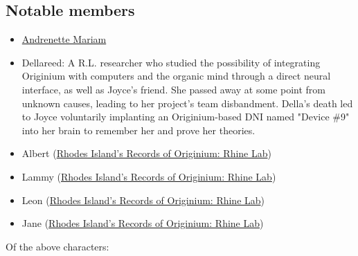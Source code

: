 \documentclass[12pt]{article}
\begin{document}
\begin{multicols}{2}
\section{Notable members}

\begin{itemize}
    \item \href{https://arknights.fandom.com/wiki/Andrenette_Mariam}{Andrenette Mariam}
    \item Dellareed: A R.L. researcher who studied the possibility of integrating Originium with computers and the organic mind through a direct neural interface, as well as Joyce's friend. She passed away at some point from unknown causes, leading to her project's team disbandment. Della's death led to Joyce voluntarily implanting an Originium-based DNI named "Device \#9" into her brain to remember her and prove her theories.\cite{6}
    \item Albert (\href{https://arknights.fandom.com/wiki/Rhodes_Island%27s_Records_of_Originium/Rhine_Lab}{Rhodes Island's Records of Originium: Rhine Lab})
    \item Lammy (\href{https://arknights.fandom.com/wiki/Rhodes_Island%27s_Records_of_Originium/Rhine_Lab}{Rhodes Island's Records of Originium: Rhine Lab})
    \item Leon (\href{https://arknights.fandom.com/wiki/Rhodes_Island%27s_Records_of_Originium/Rhine_Lab}{Rhodes Island's Records of Originium: Rhine Lab})
    \item Jane (\href{https://arknights.fandom.com/wiki/Rhodes_Island%27s_Records_of_Originium/Rhine_Lab}{Rhodes Island's Records of Originium: Rhine Lab})
\end{itemize}

Of the above characters:


\end{multicols}
\end{document}
